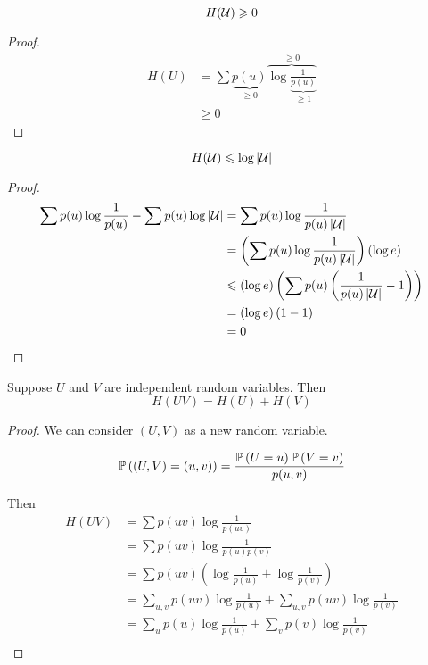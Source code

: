 \begin{proposition}
    \[
        H(\mathcal{U}) \geqslant 0    
    \]
\end{proposition}
\begin{proof}
    \[
        \begin{aligned}
            H(U) &= \sum \underbrace{p(u)}_{\geqslant 0} \overbrace{\log \underbrace{\frac{1}{p(u)}}_{\geqslant 1}}^{\geqslant 0}\\
            &\geqslant 0
        \end{aligned}            
    \]
\end{proof}

\begin{proposition}
    \[
        H(\mathcal{U}) \leqslant \log \left\lvert \mathcal{U} \right\rvert
    \]
\end{proposition}
\begin{proof}
    \[
        \begin{aligned}
            \sum p(u) \log \frac{1}{p(u)} - \sum p(u) \log\left\lvert \mathcal{U} \right\rvert &= \sum p(u) \log \frac{1}{p(u) \left\lvert\mathcal{U}\right\rvert}\\
            &= \left( \sum p(u) \log \frac{1}{p(u)\left\lvert \mathcal{U} \right\rvert} \right) \left( \log e\right)\\
            &\leqslant \left( \log e\right)\left( \sum p(u)\left( \frac{1}{p(u)\left\lvert \mathcal{U}\right\rvert}-1\right) \right)\\
            &=\left( \log e\right)\left( 1-1 \right)\\
            &= 0
        \end{aligned}
    \]
\end{proof}

\begin{proposition}
    Suppose $U$ and $V$ are independent random variables. Then 
    \[
        H(UV) = H(U) + H(V)
    \]
\end{proposition}
\begin{proof}
    We can consider $(U,V)$ as a new random variable.
    
    \[
        \mathbb{P}\left( (U,V) = (u,v) \right) = \frac{\mathbb{P}\left( U = u \right) \mathbb{P}\left( V = v \right)}{p(u,v)}
    \]
    
    Then 
    \[
        \begin{aligned}
            H(UV) &= \sum p(uv) \log \frac{1}{p(uv)}\\
            &= \sum p(uv) \log \frac{1}{p(u)p(v)}\\
            &= \sum p(uv) \left( \log \frac{1}{p(u)} + \log \frac{1}{p(v)}\right)\\
            &= \sum\limits_{u,v} p(uv) \log \frac{1}{p(u)} + \sum\limits_{u,v} p(uv) \log \frac{1}{p(v)}\\
            &= \sum\limits_{u} p(u) \log \frac{1}{p(u)} + \sum\limits_{v} p(v) \log \frac{1}{p(v)}\\
        \end{aligned}
    \]
\end{proof}

